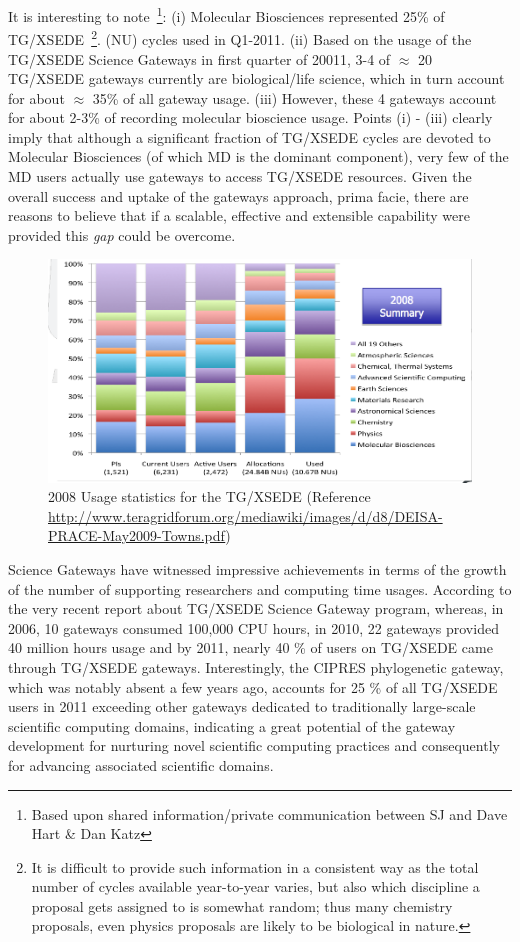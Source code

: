 \documentclass[]{svjour3}
\begin{document}
It is interesting to note~\footnote{Based upon shared
  information/private communication between SJ and Dave Hart \& Dan
  Katz}: (i) Molecular Biosciences represented 25\% of
TG/XSEDE~\footnote{It is difficult to provide such information in a
  consistent way as the total number of cycles available year-to-year
  varies, but also which discipline a proposal gets assigned to is
  somewhat random; thus many chemistry proposals, even physics
  proposals are likely to be biological in nature.}.  (NU) cycles used
in Q1-2011. (ii) Based on the usage of the TG/XSEDE Science Gateways
in first quarter of 20011, 3-4 of $\approx$ 20 TG/XSEDE gateways
currently are biological/life science, which in turn account for about
$\approx$ 35\% of all gateway usage. (iii) However, these 4 gateways
account for about 2-3\% of recording molecular bioscience
usage. Points (i) - (iii) clearly imply that although a significant
fraction of TG/XSEDE cycles are devoted to Molecular Biosciences (of
which MD is the dominant component), very few of the MD users actually
use gateways to access TG/XSEDE resources.  Given the overall success
and uptake of the gateways approach, prima facie, there are reasons to
believe that if a scalable, effective and extensible capability were
provided this {\it gap} could be overcome.
 
\begin{figure}
 \centering
\includegraphics[scale=0.27]{figures/teragrid-discipline08}
\caption{\small 2008 Usage statistics for the TG/XSEDE (Reference
  \url{http://www.teragridforum.org/mediawiki/images/d/d8/DEISA-PRACE-May2009-Towns.pdf})}
  \label{tg2008}
\end{figure}

Science Gateways have witnessed impressive achievements in terms of
the growth of the number of supporting researchers and computing time
usages\cite{gce11-nancy}. According to the very recent report about
TG/XSEDE Science Gateway program\cite{gce11-nancy}, whereas, in 2006,
10 gateways consumed 100,000 CPU hours, in 2010, 22 gateways provided
40 million hours usage and by 2011, nearly 40 \% of users on TG/XSEDE
came through TG/XSEDE gateways. Interestingly, the CIPRES phylogenetic
gateway, which was notably absent a few years ago, accounts for 25 \%
of all TG/XSEDE users in 2011 exceeding other gateways dedicated to
traditionally large-scale scientific computing domains, indicating a
great potential of the gateway development for nurturing novel
scientific computing practices and consequently for advancing
associated scientific domains.
\end{document}

